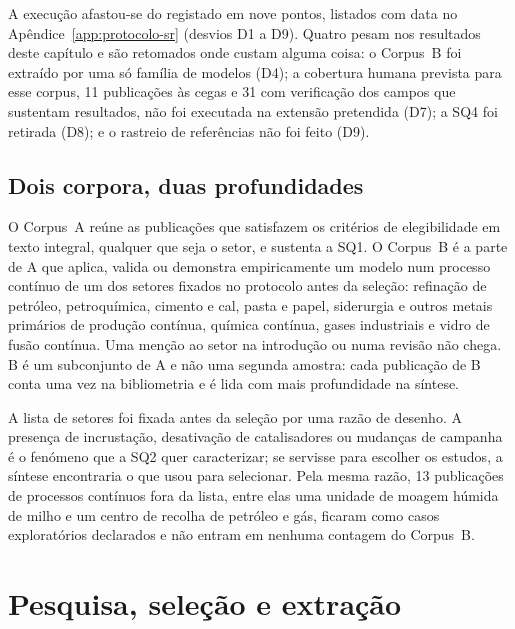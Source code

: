 A execução afastou-se do registado em nove pontos, listados com data no
Apêndice~\ref{app:protocolo-sr} (desvios D1 a D9). Quatro pesam nos
resultados deste capítulo e são retomados onde custam alguma coisa: o
Corpus~B foi extraído por uma só família de modelos (D4); a cobertura
humana prevista para esse corpus, 11 publicações às cegas e 31 com
verificação dos campos que sustentam resultados, não foi executada na extensão pretendida (D7);
a SQ4 foi retirada (D8); e o rastreio de referências não foi feito (D9).

\subsection{Dois corpora, duas profundidades}
\label{sec:dois-corpora}

O Corpus~A reúne as publicações que satisfazem os critérios de
elegibilidade em texto integral, qualquer que seja o setor, e sustenta a
SQ1. O Corpus~B é a parte de A que aplica, valida ou demonstra
empiricamente um modelo num processo contínuo de um dos setores fixados
no protocolo antes da seleção: refinação de petróleo, petroquímica,
cimento e cal, pasta e papel, siderurgia e outros metais primários de
produção contínua, química contínua, gases industriais e vidro de fusão
contínua. Uma menção ao setor na introdução ou numa revisão não chega.
B é um subconjunto de A e não uma segunda amostra: cada publicação de B
conta uma vez na bibliometria e é lida com mais profundidade na síntese.

A lista de setores foi fixada antes da seleção por uma razão de desenho.
A presença de incrustação, desativação de catalisadores ou mudanças de
campanha é o fenómeno que a SQ2 quer caracterizar; se servisse para
escolher os estudos, a síntese encontraria o que usou para selecionar.
Pela mesma razão, 13 publicações de processos contínuos fora da lista,
entre elas uma unidade de moagem húmida de milho e um centro de recolha
de petróleo e gás, ficaram como casos exploratórios declarados e não
entram em nenhuma contagem do Corpus~B.




\section{Pesquisa, seleção e extração}
\label{sec:pesquisa}


